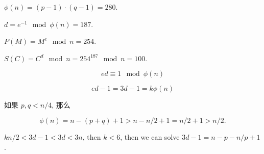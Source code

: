 \documentclass[a4paper, justified]{tufte-handout}
\begin{document}
\begin{problem}[TC 31.7-1]
\end{problem}

\begin{solution}
  $\phi(n) = (p - 1) \cdot (q - 1) = 280$.

  $d = e^{-1} \mod \phi(n) = 187$.

  $P(M) = M^e \mod n = 254$.

  $S(C) = C^d \mod n = 254^{187} \mod n = 100$.
\end{solution}

\begin{problem}[TC 31.7-2]
\end{problem}

\begin{solution}
  $$ed \equiv 1 \mod \phi(n)$$

  $$ed - 1 = 3d - 1 = k \phi(n)$$

  如果 $p, q < n / 4$, 那么

  $$\phi(n) = n - (p + q) + 1 > n - n / 2 + 1 = n / 2 + 1 > n / 2.$$

  $kn / 2 < 3d - 1 < 3d < 3n$, then $k < 6$, then we can solve $3d - 1 = n - p - n / p + 1$.
\end{solution}

\begin{problem}[TC Problem 31-3]
\end{problem}
\end{document}
